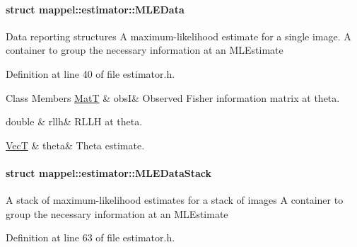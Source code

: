 \paragraph{struct mappel\+:\+:estimator\+:\+:M\+L\+E\+Data}
Data reporting structures A maximum-\/likelihood estimate for a single image. A container to group the necessary information at an M\+L\+Estimate 

Definition at line 40 of file estimator.\+h.

\begin{DoxyFields}{Class Members}
\hyperlink{namespacemappel_a7091ab87c528041f7e2027195fad8915}{MatT}\hypertarget{namespacemappel_1_1estimator_af7233cac905a2e7b6e3aa04ed8e10704}{}\label{namespacemappel_1_1estimator_af7233cac905a2e7b6e3aa04ed8e10704}
&
obsI&
Observed Fisher information matrix at theta. \\
\hline

double\hypertarget{namespacemappel_1_1estimator_a0785477579e8ab6b63ab45b4633b1092}{}\label{namespacemappel_1_1estimator_a0785477579e8ab6b63ab45b4633b1092}
&
rllh&
R\+L\+LH at theta. \\
\hline

\hyperlink{namespacemappel_a2225ad69f358daa3f4f99282a35b9a3a}{VecT}\hypertarget{namespacemappel_1_1estimator_addec61571297c6dbadc300dfcabe9c05}{}\label{namespacemappel_1_1estimator_addec61571297c6dbadc300dfcabe9c05}
&
theta&
Theta estimate. \\
\hline

\end{DoxyFields}
\label{structmappel_1_1estimator_1_1MLEDataStack}
\hypertarget{namespacemappel_1_1estimator_structmappel_1_1estimator_1_1MLEDataStack}{}
\paragraph{struct mappel\+:\+:estimator\+:\+:M\+L\+E\+Data\+Stack}
A stack of maximum-\/likelihood estimates for a stack of images A container to group the necessary information at an M\+L\+Estimate 

Definition at line 63 of file estimator.\+h.

